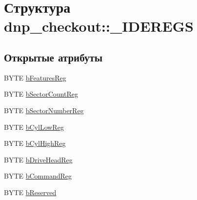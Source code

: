 \hypertarget{structdnp__checkout_1_1___i_d_e_r_e_g_s}{\section{Структура dnp\-\_\-checkout\-:\-:\-\_\-\-I\-D\-E\-R\-E\-G\-S}
\label{structdnp__checkout_1_1___i_d_e_r_e_g_s}
}
\subsection*{Открытые атрибуты}
\begin{DoxyCompactItemize}
\item 
B\-Y\-T\-E \hyperlink{structdnp__checkout_1_1___i_d_e_r_e_g_s_ae192eecc1691418f989e24d19d2439aa}{b\-Features\-Reg}
\item 
B\-Y\-T\-E \hyperlink{structdnp__checkout_1_1___i_d_e_r_e_g_s_a2b4d352ad46c98e5eec1fc96419cd66f}{b\-Sector\-Count\-Reg}
\item 
B\-Y\-T\-E \hyperlink{structdnp__checkout_1_1___i_d_e_r_e_g_s_abb737f24a526ecdc728f1c15ac16628a}{b\-Sector\-Number\-Reg}
\item 
B\-Y\-T\-E \hyperlink{structdnp__checkout_1_1___i_d_e_r_e_g_s_a2593967cf8daedc0edd9747af3d0fe90}{b\-Cyl\-Low\-Reg}
\item 
B\-Y\-T\-E \hyperlink{structdnp__checkout_1_1___i_d_e_r_e_g_s_aa66c342f5a80f9962a1e89442f9e8e86}{b\-Cyl\-High\-Reg}
\item 
B\-Y\-T\-E \hyperlink{structdnp__checkout_1_1___i_d_e_r_e_g_s_ab04f477d65c5b9db39d5f1026378174e}{b\-Drive\-Head\-Reg}
\item 
B\-Y\-T\-E \hyperlink{structdnp__checkout_1_1___i_d_e_r_e_g_s_aef2c58325662d3c7c5ec8d98ac50c124}{b\-Command\-Reg}
\item 
B\-Y\-T\-E \hyperlink{structdnp__checkout_1_1___i_d_e_r_e_g_s_a427f8f9200f2bd93d2330cedd4614b34}{b\-Reserved}
\end{DoxyCompactItemize}


